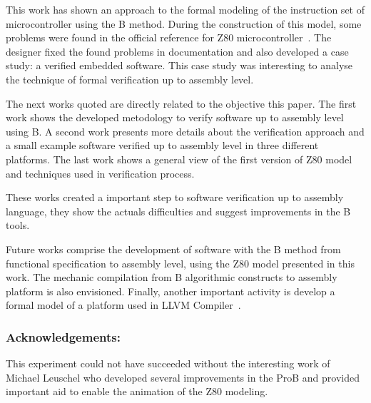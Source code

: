 \documentclass[a4paper]{llncs}
\begin{document}
This work has shown an approach to the formal modeling of the instruction set of
microcontroller using the B method. During the construction of this model, some
problems were found in the official reference for Z80
microcontroller~\cite{Z80_manual}. The designer fixed the found problems in
documentation and also developed a case study: a verified embedded software. This
case study was interesting to analyse the technique of formal verification up to
assembly level. 


The next works quoted are directly related to the objective this paper.
The first work \cite{DantasSemish2008} shows the developed metodology to verify
software up to assembly level using B. A second work\cite{Dantas_SBMF08}
presents more details about the verification approach and a small example
software verified up to assembly level in three different platforms. 
The last work \cite{Valerio_SBMF09} shows a general view of the first version of Z80
model and techniques used in verification process.

These works created a important step to software verification up to assembly
language, they show the actuals difficulties and suggest improvements in the
B tools. 





Future works comprise the development of software with the B method from
functional specification to assembly level, using the Z80 model presented in this
work. The mechanic compilation from B algorithmic constructs to assembly platform
is also envisioned. Finally, another important activity is develop a formal model of a platform used in LLVM Compiler~\cite{DBLP:conf/cgo/LattnerA04}.



\subsubsection{Acknowledgements:} This experiment could not have succeeded without the interesting work of Michael Leuschel who developed several improvements in the ProB and provided important aid to enable the animation of the Z80 modeling.

\end{document}
